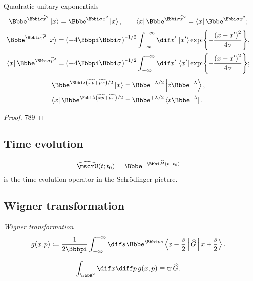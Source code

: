 \begin{namedthm}{Quadratic unitary exponentials}
\begin{equation}
\ee^{\ii \sigma \widehat{x}^2} \Ket{x} = \ee^{\ii \sigma x^2} \Ket{x},
\qquad
\Bra{x} \ee^{\ii \sigma \widehat{x}^2} = \Bra{x} \ee^{\ii \sigma x^2};
\end{equation}
\begin{align}
	\ee^{\ii \sigma \widehat{p}^2} \Ket{x}
	&= \rbr{-4\pp\ii\sigma}^{-1/2}\int_{-\infty}^{+\infty}\dif x'\,\Ket{x'}
	\cfun{\expi}{-\frac{\rbr{x-x'}^2}{4\sigma}}, \nonumber \\
	\Bra{x} \ee^{\ii \sigma \widehat{p}^2}
	&= \rbr{-4\pp\ii\sigma}^{-1/2}\int_{-\infty}^{+\infty}\dif x'\,\Bra{x'}
	\cfun{\expi}{-\frac{\rbr{x-x'}^2}{4\sigma}};
\end{align}
\begin{align}
	\ee^{\ii \lambda \rbr{\widehat{x}\widehat{p}
		+ \widehat{p}\widehat{x}}/2} \Ket{x}
	&= \ee^{-\lambda/2} \Ket{x\ee^{-\lambda}}, \nonumber \\
	\Bra{x} \ee^{\ii \lambda \rbr{\widehat{x}\widehat{p}
		+ \widehat{p}\widehat{x}}/2}
	&= \ee^{+\lambda/2} \bra{x\ee^{+\lambda}}.
\end{align}

\end{namedthm} %
\begin{proof}
789
\end{proof}



\subsection{Time evolution}

\begin{equation}
\rfun{\widehat{\mscrU}}{t;t_0} = \ee^{-\ii \widehat{H}\rbr{t-t_0}}
\end{equation}
is the time-evolution operator in the Schrödinger picture.

\subsection{Wigner transformation}

\emph{Wigner transformation}
\begin{equation}
\rfun{g}{x,p} \coloneqq \frac{1}{2\pp}\int_{-\infty}^{+\infty}\dif s\,
\ee^{\ii p s} \Braket{ x-\frac{s}{2} | \widehat{G} | x + \frac{s}{2} }.
\end{equation}

\begin{equation}
\int_{\BbbR^2}\dif x\diff p\,\rfun{g}{x,p} \equiv \tr \widehat{G}.
\end{equation}

\